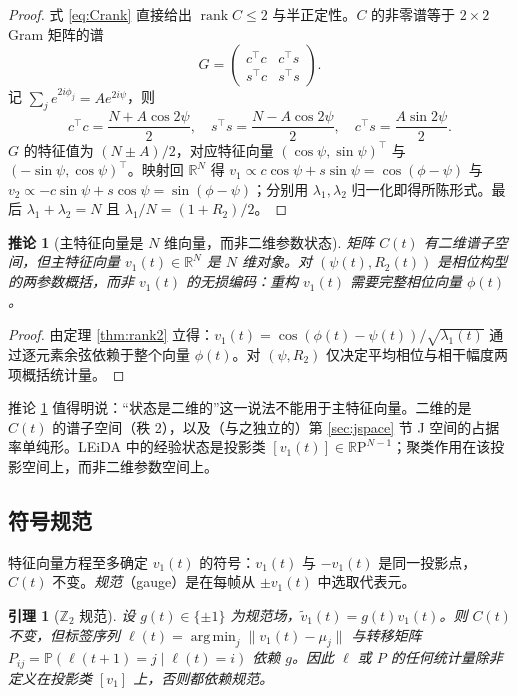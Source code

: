 \documentclass[11pt]{ctexart}
\newtheorem{lemma}{引理}
\newtheorem{corollary}{推论}
\theoremstyle{definition}
\newcommand{\R}{\mathbb{R}}
\newcommand{\Prob}{\mathbb{P}}
\newcommand{\rank}{\operatorname{rank}}
\newcommand{\RP}{\mathbb{R}\mathrm{P}}
\DeclareMathOperator*{\argmin}{arg\,min}
\begin{document}
\begin{proof}
式 \eqref{eq:Crank} 直接给出 $\rank C\le2$ 与半正定性。$C$ 的非零谱等于 $2\times2$ Gram 矩阵的谱
\begin{equation}
G=\begin{pmatrix}c^{\top}c & c^{\top}s\\ s^{\top}c & s^{\top}s\end{pmatrix}.
\end{equation}
记 $\sum_j e^{2i\phi_j}=A e^{2i\psi}$，则
\begin{equation}
c^{\top}c=\frac{N+A\cos2\psi}{2},\quad
s^{\top}s=\frac{N-A\cos2\psi}{2},\quad
c^{\top}s=\frac{A\sin2\psi}{2}.
\end{equation}
$G$ 的特征值为 $(N\pm A)/2$，对应特征向量 $(\cos\psi,\sin\psi)^{\top}$ 与 $(-\sin\psi,\cos\psi)^{\top}$。映射回 $\R^N$ 得 $v_1\propto c\cos\psi+s\sin\psi=\cos(\phi-\psi)$ 与 $v_2\propto-c\sin\psi+s\cos\psi=\sin(\phi-\psi)$；分别用 $\lambda_1,\lambda_2$ 归一化即得所陈形式。最后 $\lambda_1+\lambda_2=N$ 且 $\lambda_1/N=(1+R_2)/2$。
\end{proof}

\begin{corollary}[主特征向量是 $N$ 维向量，而非二维参数状态]
\label{cor:not2d}
矩阵 $C(t)$ 有二维\emph{谱子空间}，但主特征向量 $v_1(t)\in\R^N$ 是 $N$ 维对象。对 $(\psi(t),R_2(t))$ 是相位构型的两参数概括，而非 $v_1(t)$ 的无损编码：重构 $v_1(t)$ 需要完整相位向量 $\phi(t)$。
\end{corollary}

\begin{proof}
由定理 \ref{thm:rank2} 立得：$v_1(t)=\cos(\phi(t)-\psi(t))/\sqrt{\lambda_1(t)}$ 通过逐元素余弦依赖于整个向量 $\phi(t)$。对 $(\psi,R_2)$ 仅决定平均相位与相干幅度两项概括统计量。
\end{proof}

推论 \ref{cor:not2d} 值得明说：“状态是二维的”这一说法不能用于主特征向量。二维的是 $C(t)$ 的谱子空间（秩 2），以及（与之独立的）第 \ref{sec:jspace} 节 J 空间的占据率单纯形。LEiDA 中的经验状态是投影类 $[v_1(t)]\in\RP^{N-1}$；聚类作用在该投影空间上，而非二维参数空间上。

\subsection{符号规范}
特征向量方程至多确定 $v_1(t)$ 的符号：$v_1(t)$ 与 $-v_1(t)$ 是同一投影点，$C(t)$ 不变。\emph{规范}（gauge）是在每帧从 $\pm v_1(t)$ 中选取代表元。

\begin{lemma}[$\mathbb{Z}_2$ 规范]
\label{lem:gauge}
设 $g(t)\in\{\pm1\}$ 为规范场，$\tilde v_1(t)=g(t)v_1(t)$。则 $C(t)$ 不变，但标签序列 $\ell(t)=\argmin_j\|v_1(t)-\mu_j\|$ 与转移矩阵 $P_{ij}=\Prob(\ell(t+1)=j\mid\ell(t)=i)$ 依赖 $g$。因此 $\ell$ 或 $P$ 的任何统计量除非定义在投影类 $[v_1]$ 上，否则都依赖规范。
\end{lemma}
\end{document}
